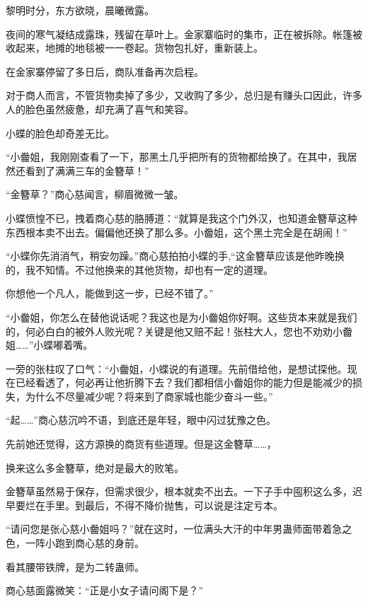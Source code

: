 
\begin{this_body}

黎明时分，东方欲晓，晨曦微露。

夜间的寒气凝结成露珠，残留在草叶上。金家寨临时的集市，正在被拆除。帐篷被收起来，地摊的地毯被一一卷起。货物包扎好，重新装上。

在金家寨停留了多日后，商队准备再次启程。

对于商人而言，不管货物卖掉了多少，又收购了多少，总归是有赚头口因此，许多人的脸色虽然疲惫，却充满了喜气和笑容。

小蝶的脸色却奇差无比。

“小齤姐，我刚刚查看了一下，那黑土几乎把所有的货物都给换了。在其中，我居然还看到了满满三车的金簪草！”

“金簪草？”商心慈闻言，柳眉微微一皱。

小蝶愤惶不已，拽着商心慈的胳膊道：“就算是我这个门外汉，也知道金簪草这种东西根本卖不出去。偏偏他还换了那么多。小齤姐，这个黑土完全是在胡闹！”

“小蝶你先消消气，稍安勿躁。”商心慈拍拍小蝶的手,“这金簪草应该是他昨晚换的，我不知情。不过他换来的其他货物，却也有一定的道理。

你想他一个凡人，能做到这一步，已经不错了。”

“小齤姐，你怎么在替他说话呢？我这也是为小齤姐你好啊。这些货本来就是我们的，何必白白的被外人败光呢？关键是他又赔不起！张柱大人，您也不劝劝小齤姐……”小蝶嘟着嘴。

一旁的张柱叹了口气：“小齤姐，小蝶说的有道理。先前借给他，是想试探他。现在已经看透了，何必再让他折腾下去？我们都相信小齤姐你的能力但是能减少的损失，为什么不尽量减少呢？将来到了商家城也能少奋斗一些。”

“起……”商心慈沉吟不语，到底还是年轻，眼中闪过犹豫之色。

先前她还觉得，这方源换的商货有些道理。但是这金簪草……，

换来这么多金簪草，绝对是最大的败笔。

金簪草虽然易于保存，但需求很少，根本就卖不出去。一下子手中囤积这么多，迟早要烂在手里。到最后，不得不降价抛售，可以说是注定亏本。

“请问您是张心慈小齤姐吗？”就在这时，一位满头大汗的中年男蛊师面带着急之色，一阵小跑到商心慈的身前。

看其腰带铁牌，是为二转蛊师。

商心慈面露微笑：“正是小女子请问阁下是？”


\end{this_body}
